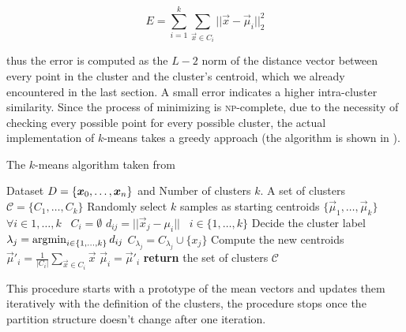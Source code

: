 \begin{equation}
	\label{eq:squared-error}
	E = \sum_{i = 1}^k\sum_{\vec{x} \in C_i}||\vec{x} - \vec{\mu}_i||_2^2
\end{equation}

thus the error is computed as the $L-2$ norm of the distance vector between every point in the
cluster and the cluster's centroid, which we already encountered in the last section. A small error
indicates a higher intra-cluster similarity. Since the process of minimizing
 is \textsc{np}-complete, due to the necessity of checking every possible
point for every possible cluster, the actual implementation of $k$-means takes a greedy approach
(the algorithm is shown in ).
\begin{algorithm}
	\caption{The $k$-means algorithm taken from~\cite{ZhouZhi-Hua2021ML}}\label{algo:kmeans}
	\begin{algorithmic}[1]
		\Require Dataset $D = \{\boldsymbol{x}_0, \ldots, \boldsymbol{x}_n\}$ and Number of clusters $k$.
		\Ensure A set of clusters $\mathcal{C} = \{C_1, \ldots, C_k\}$
		\State Randomly select $k$ samples as starting centroids $\{\vec{\mu}_1, \ldots,
		\vec{\mu}_k\}$
		\State $\forall i \in {1, \ldots, k} \hspace{10pt} C_i = \emptyset$
		\State $d_{ij} = ||\vec{x}_j - \mu_i|| \hspace{10pt} i \in \{1, \ldots, k\}$ 
		\State Decide the cluster label $\lambda_j = \operatorname*{\arg\!\min}_{i \in \{1, \ldots, k\}}d_{ij}$
		\State $C_{\lambda_j} = C_{\lambda_j}\cup\{x_j\}$
		\EndFor
		\State Compute the new centroids $\vec{\mu}'_i = \frac{1}{|C_i|} \sum_{\vec{x} \in C_i}\vec{x}$
		\EndFor
		\State $\vec{\mu}_i = \vec{\mu}'_i$
		\EndIf
		\EndWhile
		\State \textbf{return} the set of clusters $\mathcal{C}$
		\EndFunction
	\end{algorithmic}
\end{algorithm}
This procedure starts with a prototype of the mean vectors and updates them iteratively with the
definition of the clusters, the procedure stops once the partition structure doesn't change after one
iteration.












